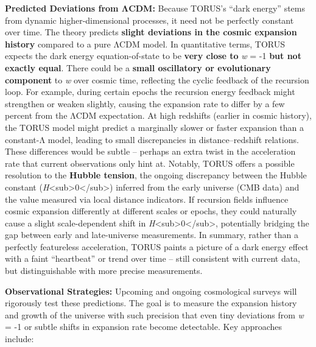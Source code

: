 \documentclass[
]{article}
\begin{document}
\textbf{Predicted Deviations from ΛCDM:} Because TORUS's ``dark energy''
stems from dynamic higher-dimensional processes, it need not be
perfectly constant over time. The theory predicts \textbf{slight
deviations in the cosmic expansion history} compared to a pure ΛCDM
model. In quantitative terms, TORUS expects the dark energy
equation-of-state to be \textbf{very close to} \emph{w} = -1 \textbf{but
not exactly equal}\hspace{0pt}. There could be a \textbf{small
oscillatory or evolutionary component} to \emph{w} over cosmic time,
reflecting the cyclic feedback of the recursion loop\hspace{0pt}. For
example, during certain epochs the recursion energy feedback might
strengthen or weaken slightly, causing the expansion rate to differ by a
few percent from the ΛCDM expectation. At high redshifts (earlier in
cosmic history), the TORUS model might predict a marginally slower or
faster expansion than a constant-Λ model, leading to small discrepancies
in distance--redshift relations\hspace{0pt}. These differences would be
subtle -- perhaps an extra twist in the acceleration rate that current
observations only hint at. Notably, TORUS offers a possible resolution
to the \textbf{Hubble tension}\hspace{0pt}, the ongoing discrepancy
between the Hubble constant
(\emph{H}\textless sub\textgreater0\textless/sub\textgreater) inferred
from the early universe (CMB data) and the value measured via local
distance indicators. If recursion fields influence cosmic expansion
differently at different scales or epochs, they could naturally cause a
slight scale-dependent shift in
\emph{H}\textless sub\textgreater0\textless/sub\textgreater\hspace{0pt},
potentially bridging the gap between early and late-universe
measurements. In summary, rather than a perfectly featureless
acceleration, TORUS paints a picture of a dark energy effect with a
faint ``heartbeat'' or trend over time -- still consistent with current
data, but distinguishable with more precise measurements.

\textbf{Observational Strategies:} Upcoming and ongoing cosmological
surveys will rigorously test these predictions. The goal is to measure
the expansion history and growth of the universe with such precision
that even tiny deviations from \emph{w} = -1 or subtle shifts in
expansion rate become detectable. Key approaches include:
\end{document}
